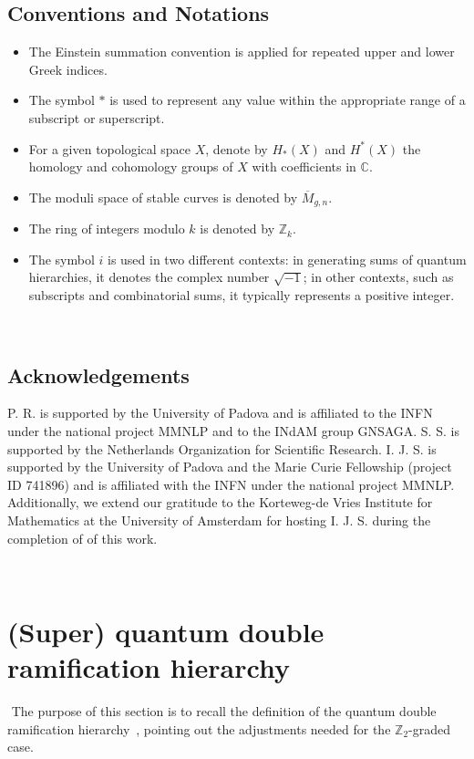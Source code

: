 \documentclass{amsart}
\numberwithin{equation}{section} %
\theoremstyle{plain}
\theoremstyle{remark}
\begin{document}
\subsection*{Conventions and Notations}
\begin{itemize}
    \item The Einstein summation convention is applied for repeated upper and lower Greek indices.
    \item The symbol $*$ is used to represent any value within the appropriate range of a subscript or superscript.
    \item For a given topological space $X$, denote by $H_*(X)$ and $H^*(X)$ the homology and cohomology groups of $X$ with coefficients in $\mathbb{C}$.
    \item The moduli space of stable curves is denoted by $\overline{M}_{g,n}$.
    \item The ring of integers modulo $k$ is denoted by $\mathbb{Z}_k$.
    \item The symbol \( i \) is used in two different contexts: in generating sums of quantum hierarchies, it denotes the complex number \(\sqrt{-1}\); in other contexts, such as subscripts and combinatorial sums, it typically represents a positive integer.
\end{itemize}
﻿
\subsection{Acknowledgements}
P. R. is supported by the University of Padova and
is affiliated to the INFN under the national project MMNLP and to the INdAM group GNSAGA. S. S. is supported by the Netherlands Organization for Scientific Research. I. J. S. is supported by the University of Padova and the Marie Curie Fellowship (project ID 741896) and is affiliated with the INFN under the national project MMNLP. Additionally, we extend our gratitude to the Korteweg-de Vries Institute for Mathematics at the University of Amsterdam for hosting I. J. S. during the completion of of this work.
 
\newpage 
﻿
﻿
\section{(Super) quantum double ramification hierarchy}
﻿
The purpose of this section is to recall the definition of the quantum double ramification hierarchy~\cite{buryak_rossi_15,buryak_dubrovin_guéré_rossi_20}, pointing out the adjustments needed for the $\mathbb{Z}_2$-graded case.
﻿
﻿
\end{document}
